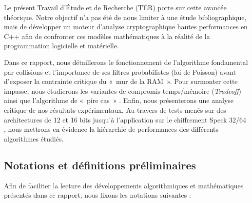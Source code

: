 \documentclass[a4paper,11pt]{article}
\begin{document}
Le présent Travail d'Étude et de Recherche (TER) porte sur cette avancée théorique. Notre objectif n'a pas été de nous limiter à une étude bibliographique, mais de développer un moteur d'analyse cryptographique hautes performances en C++ afin de confronter ces modèles mathématiques à la réalité de la programmation logicielle et matérielle. 

Dans ce rapport, nous détaillerons le fonctionnement de l'algorithme fondamental par collisions \cite{DDKRS23} et l'importance de ses filtres probabilistes (loi de Poisson) avant d'exposer la contrainte critique du «~mur de la RAM~». Pour surmonter cette impasse, nous étudierons les variantes de compromis temps/mémoire (\textit{Tradeoff}) \cite{DDKRS23} ainsi que l'algorithme de «~pire cas~» \cite{DDKRS23}. Enfin, nous présenterons une analyse critique de nos résultats expérimentaux. Au travers de tests menés sur des architectures de 12 et 16 bits jusqu'à l'application sur le chiffrement Speck 32/64 \cite{BSSTWW13}, nous mettrons en évidence la hiérarchie de performances des différents algorithmes étudiés.

\subsection*{Notations et définitions préliminaires}

Afin de faciliter la lecture des développements algorithmiques et mathématiques présentés dans ce rapport, nous fixons les notations suivantes :
\end{document}
